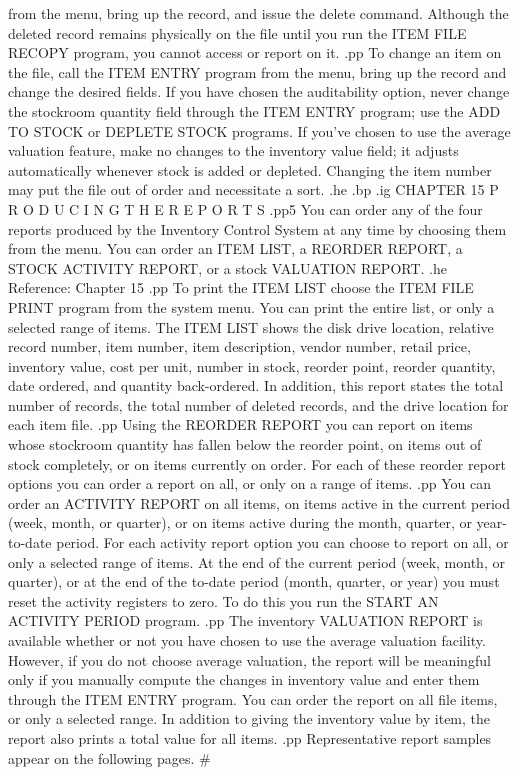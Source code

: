 from the menu, bring up the record, and issue the delete command.
Although the deleted record remains physically on the file until you
run the ITEM FILE RECOPY program, you cannot access or report on it.
.pp
To change an item on the file, call the ITEM ENTRY program from the
menu,  bring up the record and change the desired fields.  If you have
chosen the auditability option, never change
the stockroom quantity field through the ITEM ENTRY program; use the
ADD TO STOCK or DEPLETE STOCK programs.
If you've chosen to use the average
valuation feature, make no changes to the inventory value field; it
adjusts automatically whenever stock is added or depleted.  Changing
the item number may put the file out of order and necessitate a sort.
.he
.bp
.ig
CHAPTER 15
P R O D U C I N G    T H E    R E P O R T S
.pp5
You can order any of the four reports produced by the Inventory Control
System at any time by choosing them from the menu.  You can order
an ITEM LIST, a REORDER REPORT, a STOCK ACTIVITY REPORT, or a
stock VALUATION REPORT.
.he Reference: Chapter 15
.pp
To print the ITEM LIST choose the ITEM FILE PRINT program from the
system menu.  You can print the entire list, or only a selected
range of items.  The ITEM LIST shows the disk drive location, relative record
number, item number, item description, vendor number, retail price,
inventory value, cost per unit, number in stock, reorder point, reorder
quantity, date ordered, and quantity back-ordered.  In addition, this
report states the total number of records, the total number of deleted
records, and the drive location for each item file.
.pp
Using the REORDER REPORT you can report on items whose stockroom
quantity has fallen below the reorder point, on items out of stock
completely, or on items currently on order.  For each of these reorder report
options you can order a report on all, or only on a range of
items.
.pp
You can order an ACTIVITY REPORT on all items, on items active
in the current period (week, month, or quarter), or on items active
during the month, quarter, or year-to-date period.  For each activity
report option you can choose to report on all, or only a selected range
of items.  At the end of the current period (week, month, or quarter),
or at the end of the to-date period (month, quarter, or year)
you must reset the activity registers to zero.	To do this you run
the START AN ACTIVITY PERIOD program.
.pp
The inventory VALUATION REPORT is available whether or not you have chosen
to use the average valuation facility.	However, if you do not choose
average valuation, the report will be  meaningful only if you manually
compute the changes in inventory value and enter them through the ITEM ENTRY
program.
You can order the report on all file items, or only a selected range.
In addition to giving the inventory value by item, the report also
prints a total value for all items.
.pp
Representative report samples appear on the following pages.
#
